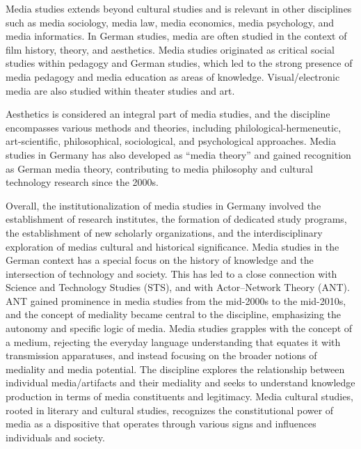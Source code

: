 \documentclass{tufte-handout}
\begin{document}
Media studies extends beyond cultural studies and is relevant in other
disciplines such as media sociology, media law, media economics, media
psychology, and media informatics. In German studies, media are often
studied in the context of film history, theory, and aesthetics. Media
studies originated as critical social studies within pedagogy and German
studies, which led to the strong presence of media pedagogy and media
education as areas of knowledge. Visual/electronic media are also
studied within theater studies and art.

Aesthetics is considered an integral part of media studies, and the
discipline encompasses various methods and theories, including
philological-hermeneutic, art-scientific, philosophical, sociological,
and psychological approaches. Media studies in Germany has also
developed as ``media theory'' and gained recognition as German media
theory, contributing to media philosophy and cultural technology
research since the 2000s.

Overall, the institutionalization of media studies in Germany involved
the establishment of research institutes, the formation of dedicated
study programs, the establishment of new scholarly organizations, and
the interdisciplinary exploration of media\textquotesingle s cultural
and historical significance. Media studies in the German context has a
special focus on the history of knowledge and the intersection of
technology and society. This has led to a close connection with Science
and Technology Studies (STS), and with Actor--Network Theory (ANT). ANT
gained prominence in media studies from the mid-2000s to the mid-2010s,
and the concept of mediality became central to the discipline,
emphasizing the autonomy and specific logic of media. Media studies
grapples with the concept of a medium, rejecting the everyday language
understanding that equates it with transmission apparatuses, and instead
focusing on the broader notions of mediality and media potential. The
discipline explores the relationship between individual media/artifacts
and their mediality and seeks to understand knowledge production in
terms of media constituents and legitimacy. Media cultural studies,
rooted in literary and cultural studies, recognizes the constitutional
power of media as a dispositive that operates through various signs and
influences individuals and society.
\end{document}
